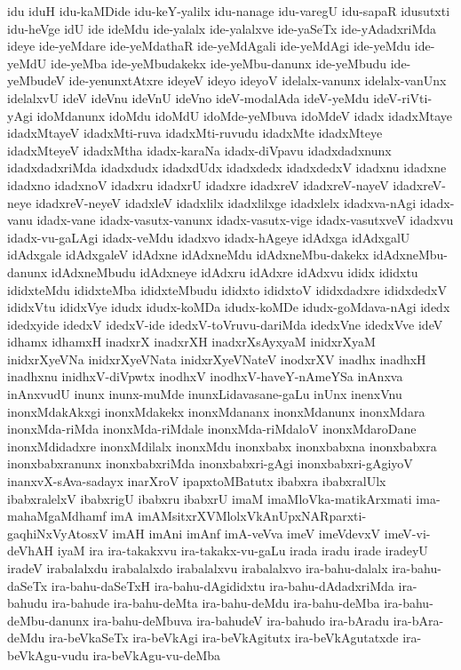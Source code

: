 {idu
iduH
idu-kaMDide
idu-keY-yalilx
idu-nanage
idu-varegU
idu-sapaR
idusutxti
idu-heVge
idU
ide
ideMdu
ide-yalalx
ide-yalalxve
ide-yaSeTx
ide-yAdadxriMda
ideye
ide-yeMdare
ide-yeMdathaR
ide-yeMdAgali
ide-yeMdAgi
ide-yeMdu
ide-yeMdU
ide-yeMba
ide-yeMbudakekx
ide-yeMbu-danunx
ide-yeMbudu
ide-yeMbudeV
ide-yenunxtAtxre
ideyeV
ideyo
ideyoV
idelalx-vanunx
idelalx-vanUnx
idelalxvU
ideV
ideVnu
ideVnU
ideVno
ideV-modalAda
ideV-yeMdu
ideV-riVti-yAgi
idoMdanunx
idoMdu
idoMdU
idoMde-yeMbuva
idoMdeV
idadx
idadxMtaye
idadxMtayeV
idadxMti-ruva
idadxMti-ruvudu
idadxMte
idadxMteye
idadxMteyeV
idadxMtha
idadx-karaNa
idadx-diVpavu
idadxdadxnunx
idadxdadxriMda
idadxdudx
idadxdUdx
idadxdedx
idadxdedxV
idadxnu
idadxne
idadxno
idadxnoV
idadxru
idadxrU
idadxre
idadxreV
idadxreV-nayeV
idadxreV-neye
idadxreV-neyeV
idadxleV
idadxlilx
idadxlilxge
idadxlelx
idadxva-nAgi
idadx-vanu
idadx-vane
idadx-vasutx-vanunx
idadx-vasutx-vige
idadx-vasutxveV
idadxvu
idadx-vu-gaLAgi
idadx-veMdu
idadxvo
idadx-hAgeye
idAdxga
idAdxgalU
idAdxgale
idAdxgaleV
idAdxne
idAdxneMdu
idAdxneMbu-dakekx
idAdxneMbu-danunx
idAdxneMbudu
idAdxneye
idAdxru
idAdxre
idAdxvu
ididx
ididxtu
ididxteMdu
ididxteMba
ididxteMbudu
ididxto
ididxtoV
ididxdadxre
ididxdedxV
ididxVtu
ididxVye
idudx
idudx-koMDa
idudx-koMDe
idudx-goMdava-nAgi
idedx
idedxyide
idedxV
idedxV-ide
idedxV-toVruvu-dariMda
idedxVne
idedxVve
ideV
idhamx
idhamxH
inadxrX
inadxrXH
inadxrXsAyxyaM
inidxrXyaM
inidxrXyeVNa
inidxrXyeVNata
inidxrXyeVNateV
inodxrXV
inadhx
inadhxH
inadhxnu
inidhxV-diVpwtx
inodhxV
inodhxV-haveY-nAmeYSa
inAnxva
inAnxvudU
inunx
inunx-muMde
inunxLidavasane-gaLu
inUnx
inenxVnu
inonxMdakAkxgi
inonxMdakekx
inonxMdananx
inonxMdanunx
inonxMdara
inonxMda-riMda
inonxMda-riMdale
inonxMda-riMdaloV
inonxMdaroDane
inonxMdidadxre
inonxMdilalx
inonxMdu
inonxbabx
inonxbabxna
inonxbabxra
inonxbabxranunx
inonxbabxriMda
inonxbabxri-gAgi
inonxbabxri-gAgiyoV
inanxvX-sAva-sadayx
inarXroV
ipapxtoMBatutx
ibabxra
ibabxralUlx
ibabxralelxV
ibabxrigU
ibabxru
ibabxrU
imaM
imaMloVka-matikArxmati
ima-mahaMgaMdhamf
imA
imAMsitxrXVMlolxVkAnUpxNARparxti-gaqhiNxVyAtosxV
imAH
imAni
imAnf
imA-veVva
imeV
imeVdevxV
imeV-vi-deVhAH
iyaM
ira
ira-takakxvu
ira-takakx-vu-gaLu
irada
iradu
irade
iradeyU
iradeV
irabalalxdu
irabalalxdo
irabalalxvu
irabalalxvo
ira-bahu-dalalx
ira-bahu-daSeTx
ira-bahu-daSeTxH
ira-bahu-dAgididxtu
ira-bahu-dAdadxriMda
ira-bahudu
ira-bahude
ira-bahu-deMta
ira-bahu-deMdu
ira-bahu-deMba
ira-bahu-deMbu-danunx
ira-bahu-deMbuva
ira-bahudeV
ira-bahudo
ira-bAradu
ira-bAra-deMdu
ira-beVkaSeTx
ira-beVkAgi
ira-beVkAgitutx
ira-beVkAgutatxde
ira-beVkAgu-vudu
ira-beVkAgu-vu-deMba
}
